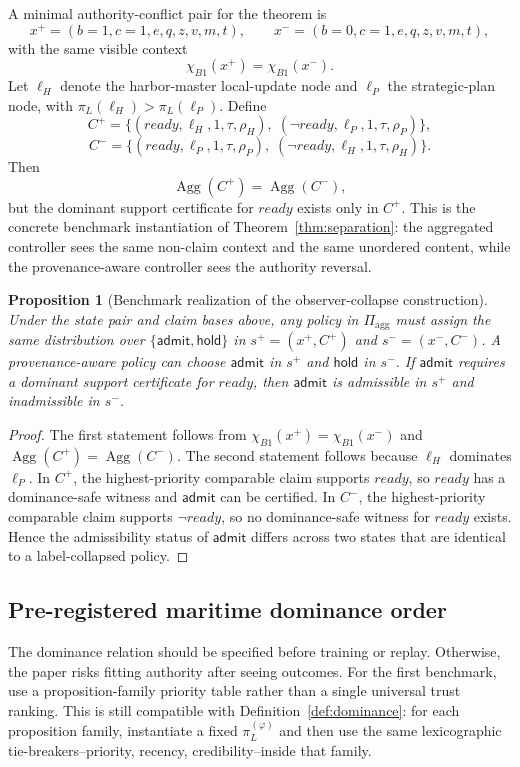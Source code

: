 \documentclass[11pt]{article}
\newcommand{\Agg}{\operatorname{Agg}}
\newcommand{\1}{\mathbf{1}}
\theoremstyle{definition}
\theoremstyle{plain}
\newtheorem{proposition}[definition]{Proposition}
\theoremstyle{remark}
\begin{document}
A minimal authority-conflict pair for the theorem is
\[
x^+=(b=1,c=1,e,q,z,v,m,t),
\qquad
x^-=(b=0,c=1,e,q,z,v,m,t),
\]
with the same visible context
\[
\chi_{B1}(x^+)=\chi_{B1}(x^-).
\]
Let $\ell_H$ denote the harbor-master local-update node and $\ell_P$ the strategic-plan node, with $\pi_L(\ell_H)>\pi_L(\ell_P)$. Define
\[
C^+=\{(ready,\ell_H,1,\tau,\rho_H),\;(\neg ready,\ell_P,1,\tau,\rho_P)\},
\]
\[
C^-=\{(ready,\ell_P,1,\tau,\rho_P),\;(\neg ready,\ell_H,1,\tau,\rho_H)\}.
\]
Then
\[
\Agg(C^+)=\Agg(C^-),
\]
but the dominant support certificate for $ready$ exists only in $C^+$. This is the concrete benchmark instantiation of Theorem~\ref{thm:separation}: the aggregated controller sees the same non-claim context and the same unordered content, while the provenance-aware controller sees the authority reversal.

\begin{proposition}[Benchmark realization of the observer-collapse construction]
\label{supp:prop:b1-realizes-separation}
Under the state pair and claim bases above, any policy in $\Pi_{\mathrm{agg}}$ must assign the same distribution over $\{\mathsf{admit},\mathsf{hold}\}$ in $s^+=(x^+,C^+)$ and $s^-=(x^-,C^-)$. A provenance-aware policy can choose $\mathsf{admit}$ in $s^+$ and $\mathsf{hold}$ in $s^-$. If $\mathsf{admit}$ requires a dominant support certificate for $ready$, then $\mathsf{admit}$ is admissible in $s^+$ and inadmissible in $s^-$.
\end{proposition}

\begin{proof}
The first statement follows from $\chi_{B1}(x^+)=\chi_{B1}(x^-)$ and $\Agg(C^+)=\Agg(C^-)$. The second statement follows because $\ell_H$ dominates $\ell_P$. In $C^+$, the highest-priority comparable claim supports $ready$, so $ready$ has a dominance-safe witness and $\mathsf{admit}$ can be certified. In $C^-$, the highest-priority comparable claim supports $\neg ready$, so no dominance-safe witness for $ready$ exists. Hence the admissibility status of $\mathsf{admit}$ differs across two states that are identical to a label-collapsed policy.
\end{proof}

\subsection{Pre-registered maritime dominance order}
\label{supp:subsec:dominance-prereg}

The dominance relation should be specified before training or replay. Otherwise, the paper risks fitting authority after seeing outcomes. For the first benchmark, use a proposition-family priority table rather than a single universal trust ranking. This is still compatible with Definition~\ref{def:dominance}: for each proposition family, instantiate a fixed $\pi_L^{(\varphi)}$ and then use the same lexicographic tie-breakers--priority, recency, credibility--inside that family.
\end{document}
